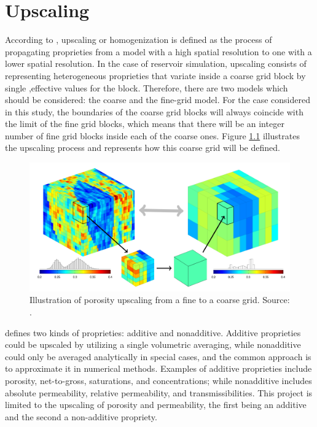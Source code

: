 \chapter{Upscaling}
\label{upscaling}

According to \cite{Lie2015}, upscaling or homogenization is defined as the process of propagating proprieties from a model with a high spatial resolution to one with a lower spatial resolution. In the case of reservoir simulation, upscaling consists of representing heterogeneous proprieties that variate inside a coarse grid block by single ,effective values for the block. Therefore, there are two models which should be considered: the coarse and the fine-grid model. For the case considered in this study, the boundaries of the coarse grid blocks will always coincide with the limit of the fine grid blocks, which means that there will be an integer number of fine grid blocks inside each of the coarse ones. Figure \ref{fig:19} illustrates the upscaling process and represents how this coarse grid will be defined.

\begin{figure}[h]
	\centering
	\includegraphics[width=0.8\linewidth]{Images/19}
	\caption{Illustration of porosity upscaling from a fine to a coarse grid. Source: \cite{Lie2015}.}
	\label{fig:19}
\end{figure}

\cite{Lie2015} defines two kinds of proprieties: additive and nonadditive. Additive proprieties could be upscaled by utilizing a single volumetric averaging, while nonadditive could only be averaged analytically in special cases, and the common approach is to approximate it in numerical methods. Examples of additive proprieties include porosity, net-to-gross, saturations, and concentrations; while nonadditive includes absolute permeability, relative permeability, and transmissibilities. This project is limited to the upscaling of porosity and permeability, the first being an additive and the second a non-additive propriety.

